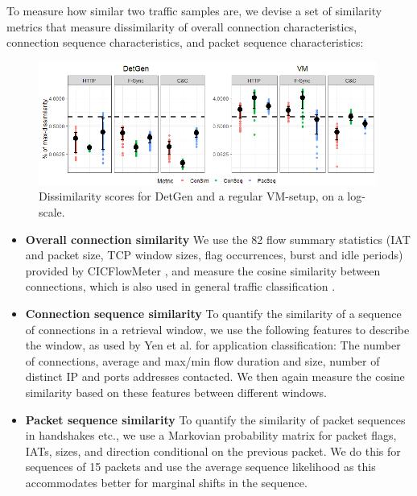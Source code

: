 \documentclass[runningheads]{llncs}
\begin{document}
To measure how similar two traffic samples are, we devise a set of similarity metrics that measure dissimilarity of overall connection characteristics, connection sequence characteristics, and packet sequence characteristics:


\begin{figure}
\centering
\includegraphics[width=0.99\textwidth]{images/Exp111.png}
\caption{Dissimilarity scores for DetGen and a regular VM-setup, on a log-scale.}\label{Fig:determ-metric}
\end{figure}

\begin{itemize}
\item \textbf{Overall connection similarity} We use the 82 flow summary statistics (IAT and packet size, TCP window sizes, flag occurrences, burst and idle periods) provided by CICFlowMeter \cite{lashkari2017characterization}, and measure the cosine similarity between connections, which is also used in general traffic classification \cite{aun2017review}.
\item \textbf{Connection sequence similarity} 
To quantify the similarity of a sequence of connections in a retrieval window, we use the following features to describe the window, as used by Yen et al. \cite{yen2009browser} for application classification: The number of connections, average and max/min flow duration and size, number of distinct IP and ports addresses contacted. We then again measure the cosine similarity based on these features between different windows. 
\item \textbf{Packet sequence similarity} To quantify the similarity of packet sequences in handshakes etc., we use a Markovian probability matrix for packet flags, IATs, sizes, and direction conditional on the previous packet. We do this for sequences of 15 packets and use the average sequence likelihood as this accommodates better for marginal shifts in the sequence. %
\end{itemize}
\end{document}

